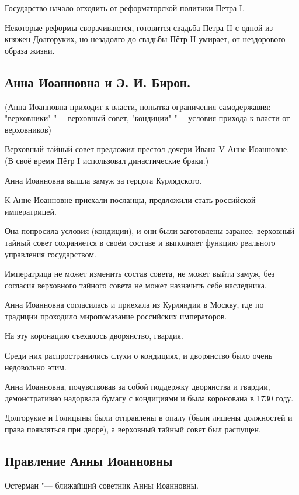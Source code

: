 Государство начало отходить от реформаторской политики Петра I. 

Некоторые реформы сворачиваются, готовится свадьба Петра II с одной из княжен Долгоруких, но незадолго до свадьбы Пётр II умирает, от нездорового образа жизни.

\subsection{Анна Иоанновна и Э. И. Бирон.}

(Анна Иоанновна приходит к власти, попытка ограничения самодержавия: "верховники" "--- верховный совет, "кондиции" "--- условия прихода к власти от верховников)

Верховный тайный совет предложил престол дочери Ивана V Анне Иоанновне. (В своё время Пётр I использовал династические браки.)

Анна Иоанновна вышла замуж за герцога Курлядского. 

К Анне Иоанновне приехали посланцы, предложили стать российской императрицей. 

Она попросила условия (кондиции), и они были заготовлены заранее: верховный тайный совет сохраняется в своём составе и выполняет функцию реального управления государством. 

Императрица не может изменить состав совета, не может выйти замуж, без согласия верховного тайного совета не может назначить себе наследника.

Анна Иоанновна согласилась и приехала из Курляндии в Москву, где по традиции проходило миропомазание российских императоров. 

На эту коронацию съехалось дворянство, гвардия. 

Среди них распространились слухи о кондициях, и дворянство было очень недовольно этим. 

Анна Иоанновна, почувствовав за собой поддержку дворянства и гвардии, демонстративно надорвала бумагу с кондициями и была коронована в 1730 году. 

Долгорукие и Голицыны были отправлены в опалу (были лишены должностей и права появляться при дворе), а верховный тайный совет был распущен.

\subsection{Правление Анны Иоанновны}

Остерман "--- ближайший советник Анны Иоанновны.

